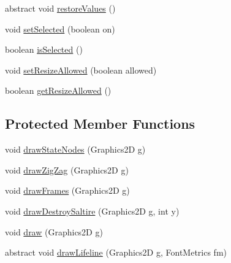 \begin{DoxyCompactItemize}
\item 
abstract void \hyperlink{classorg_1_1tzi_1_1use_1_1gui_1_1views_1_1diagrams_1_1behavior_1_1sequencediagram_1_1_lifeline_a2a8d5e536260b02cccaeaf5c008fd46e}{restore\-Values} ()
\item 
void \hyperlink{classorg_1_1tzi_1_1use_1_1gui_1_1views_1_1diagrams_1_1behavior_1_1sequencediagram_1_1_lifeline_a52ee6bd7c711ad88b4c8c6a4880bdc91}{set\-Selected} (boolean on)
\item 
boolean \hyperlink{classorg_1_1tzi_1_1use_1_1gui_1_1views_1_1diagrams_1_1behavior_1_1sequencediagram_1_1_lifeline_addde911206186b550e2b94f13d74ee57}{is\-Selected} ()
\item 
void \hyperlink{classorg_1_1tzi_1_1use_1_1gui_1_1views_1_1diagrams_1_1behavior_1_1sequencediagram_1_1_lifeline_a0b4d0769196a1d32ba015d7ee15a5d00}{set\-Resize\-Allowed} (boolean allowed)
\item 
boolean \hyperlink{classorg_1_1tzi_1_1use_1_1gui_1_1views_1_1diagrams_1_1behavior_1_1sequencediagram_1_1_lifeline_a632abbc9be4e5773468dd539d1aba1fa}{get\-Resize\-Allowed} ()
\end{DoxyCompactItemize}
\subsection*{Protected Member Functions}
\begin{DoxyCompactItemize}
\item 
void \hyperlink{classorg_1_1tzi_1_1use_1_1gui_1_1views_1_1diagrams_1_1behavior_1_1sequencediagram_1_1_lifeline_aebbe4490c21783f64ea0fbeef437f785}{draw\-State\-Nodes} (Graphics2\-D g)
\item 
void \hyperlink{classorg_1_1tzi_1_1use_1_1gui_1_1views_1_1diagrams_1_1behavior_1_1sequencediagram_1_1_lifeline_a2c29e11aba86e291bb199c25ba19c47e}{draw\-Zig\-Zag} (Graphics2\-D g)
\item 
void \hyperlink{classorg_1_1tzi_1_1use_1_1gui_1_1views_1_1diagrams_1_1behavior_1_1sequencediagram_1_1_lifeline_a878bccae89b2b81404897f56f5b97d7c}{draw\-Frames} (Graphics2\-D g)
\item 
void \hyperlink{classorg_1_1tzi_1_1use_1_1gui_1_1views_1_1diagrams_1_1behavior_1_1sequencediagram_1_1_lifeline_a4caff1c801c345a64e9abdbdeafcbaa8}{draw\-Destroy\-Saltire} (Graphics2\-D g, int y)
\item 
void \hyperlink{classorg_1_1tzi_1_1use_1_1gui_1_1views_1_1diagrams_1_1behavior_1_1sequencediagram_1_1_lifeline_adb83abe39381883425f29a8d27a0a543}{draw} (Graphics2\-D g)
\item 
abstract void \hyperlink{classorg_1_1tzi_1_1use_1_1gui_1_1views_1_1diagrams_1_1behavior_1_1sequencediagram_1_1_lifeline_a142ceb0a2986a8dd1239ee9de20b36de}{draw\-Lifeline} (Graphics2\-D g, Font\-Metrics fm)
\end{DoxyCompactItemize}

